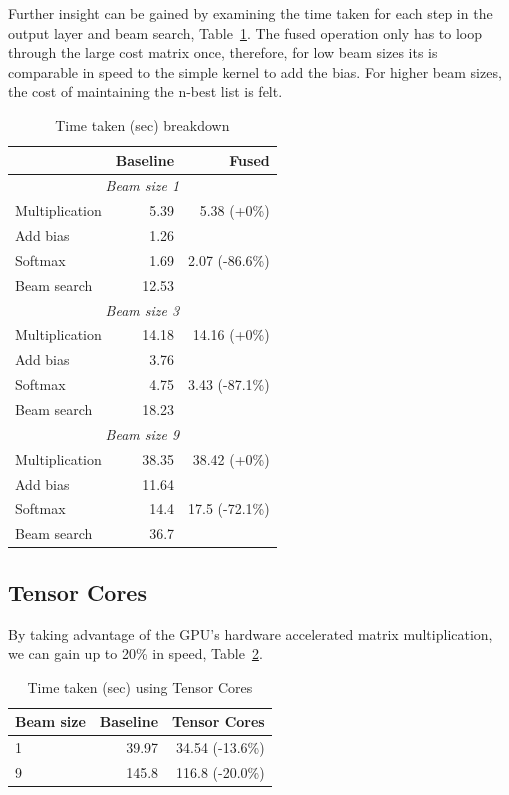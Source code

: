 \documentclass[11pt,a4paper]{article}
\begin{document}
Further insight can be gained by examining the time taken for each step in the output layer and beam search, Table~\ref{tab:fused-breakdown}. The fused operation only has to loop through the large cost matrix once, therefore, for low beam sizes its is comparable in speed to the simple kernel to add the bias. For higher beam sizes, the cost of maintaining the n-best list is felt.

\begin{table}
\begin{center}
\begin{tabular}{|l|r|r|} \hline
		& Baseline	& Fused \\ \hline
\multicolumn{3}{|c|}{\emph{Beam size 1}}	\\ \hline	
Multiplication 	& 5.39 		& 5.38 (+0\%) \\ \hline
Add bias 	& 1.26		&  \\ 
Softmax 	& 1.69		& 2.07 (-86.6\%)\\
Beam search	& 12.53		&  \\ \hline
\multicolumn{3}{|c|}{\emph{Beam size 3}}	\\ \hline	
Multiplication 	& 14.18 	& 14.16 (+0\%) \\ \hline
Add bias 	& 3.76		&  \\ 
Softmax 	& 4.75		& 3.43 (-87.1\%)\\
Beam search	& 18.23		&  \\ \hline
\multicolumn{3}{|c|}{\emph{Beam size 9}}	\\ \hline	
Multiplication 	& 38.35 	& 38.42 (+0\%) \\ \hline
Add bias 	& 11.64		&  \\ 
Softmax 	& 14.4		& 17.5 (-72.1\%)\\
Beam search	& 36.7		&  \\ \hline
\end{tabular}
\end{center}
\caption{Time taken (sec) breakdown}
\label{tab:fused-breakdown}
\end{table}

\subsection{Tensor Cores}

By taking advantage of the GPU's hardware accelerated matrix multiplication, we can gain up to 20\% in speed, Table~\ref{tab:tensor-cores}.

\begin{table}
\begin{center}
\begin{tabular}{|l|r|r|} \hline
Beam size	& Baseline	& Tensor Cores \\ \hline
1	 	& 39.97 	& 34.54 (-13.6\%) \\ 
9 		& 145.8		& 116.8 (-20.0\%) \\ \hline
\end{tabular}
\end{center}
\caption{Time taken (sec) using Tensor Cores}
\label{tab:tensor-cores}
\end{table}
\end{document}
